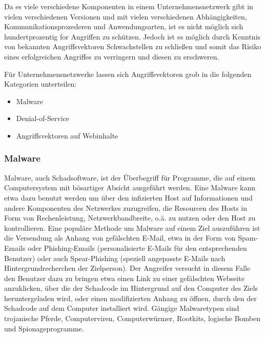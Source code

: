 Da es viele verschiedene Komponenten in einem Unternehmensnetzwerk gibt in vielen verschiedenen Versionen und mit vielen verschiedenen Abhängigkeiten, Kommunikationsprozederen und Anwendungsarten, ist es nicht möglich sich hundertprozentig for Angriffen zu schützen. Jedoch ist es möglich durch Kenntnis von bekannten Angriffsvektoren Schwachstellen zu schließen und somit das Risiko eines erfolgreichen Angriffes zu verringern und diesen zu erschweren.

Für Unternehmensnetzwerke lassen sich Angriffsvektoren grob in die folgenden Kategorien unterteilen:
\begin{itemize}
\item \glqq Malware\grqq 
\item \glqq Denial-of-Service\grqq
\item \glqq Angriffsvektoren auf Webinhalte \grqq
\end{itemize}

\subsubsection{Malware}
Malware, auch Schadsoftware, ist der Überbegriff für Programme, die auf einem Computersystem mit bösartiger Absicht ausgeführt werden. Eine Malware kann etwa dazu benutzt werden um über den infizierten Host auf Informationen und andere Komponenten des Netzwerkes zuzugreifen, die Resourcen des Hosts in Form von Rechenleistung, Netzwerkbandbreite, o.ä. zu nutzen oder den Host zu kontrollieren.
Eine populäre Methode um Malware auf einem Ziel auszuführen ist die Versendung als Anhang von gefälschten E-Mail, etwa in der Form von Spam-Emails oder  Phishing-Emails (personalisierte E-Mails für den entsprechenden Benutzer) oder auch Spear-Phishing (speziell angepasste E-Mails nach Hintergrundrecherchen der Zielperson). Der Angreifer versucht in diesem Falle den Benutzer dazu zu bringen etwa einen Link zu einer gefälschten Webseite anzuklicken, über die der Schadcode im Hintergrund auf den Computer des Ziels heruntergeladen wird, oder einen modifizierten Anhang zu öffnen, durch den der Schadcode auf dem Computer installiert wird. Gängige Malwaretypen sind trojanische Pferde, Computerviren, Computerwürmer, \glqq Rootkits\grqq , logische Bomben  und Spionageprogramme.

